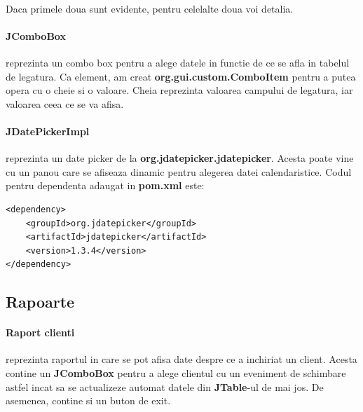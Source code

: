 \documentclass[oneside]{article}
\begin{document}
\paragraph{} Daca primele doua sunt evidente, pentru celelalte doua voi detalia.

\paragraph{JComboBox} reprezinta un combo box pentru a alege datele in functie de ce se afla in tabelul de legatura. Ca element, am creat \textbf{org.gui.custom.ComboItem} pentru a putea opera cu o cheie si o valoare. Cheia reprezinta valoarea campului de legatura, iar valoarea ceea ce se va afisa.

\paragraph{JDatePickerImpl} reprezinta un date picker de la \textbf{org.jdatepicker.jdatepicker}. Acesta poate vine cu un panou care se afiseaza dinamic pentru alegerea datei calendaristice. Codul pentru dependenta adaugat in \textbf{pom.xml} este:
\begin{center}
    \begin{lstlisting}[language=pom]
<dependency>
    <groupId>org.jdatepicker</groupId>
    <artifactId>jdatepicker</artifactId>
    <version>1.3.4</version>
</dependency>
    \end{lstlisting}
\end{center}

\subsection[Rapoarte]{Rapoarte}
\paragraph{Raport clienti} reprezinta raportul in care se pot afisa date despre ce a inchiriat un client. Acesta contine un \textbf{JComboBox} pentru a alege clientul cu un eveniment de schimbare astfel incat sa se actualizeze automat datele din \textbf{JTable}-ul de mai jos. De asemenea, contine si un buton de exit.
\end{document}
